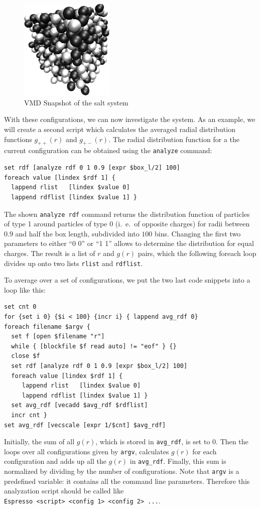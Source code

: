 \begin{figure}[tb]
  \centering
  \includegraphics[width=0.4\textwidth]{figures/salt.png}
  \caption{VMD Snapshot of the salt system}
  \label{fig:snapshot}
\end{figure}

With these configurations, we can now investigate the system. As an example, we
will create a second script which calculates the averaged radial distribution
functions $g_{++}(r)$ and $g_{+-}(r)$. The radial distribution function for a
the current configuration can be obtained using the \verb|analyze| command:
\begin{verbatim}
set rdf [analyze rdf 0 1 0.9 [expr $box_l/2] 100]
foreach value [lindex $rdf 1] {
  lappend rlist   [lindex $value 0]
  lappend rdflist [lindex $value 1] }
\end{verbatim}
The shown \verb|analyze rdf| command returns the distribution function of
particles of type 1 around particles of type 0 (i.~e.\ of opposite charges) for
radii between $0.9$ and half the box length, subdivided into $100$ bins.
Changing the first two parameters to either ``0 0'' or ``1 1'' allows to
determine the distribution for equal charges. The result is a list of $r$ and
$g(r)$ pairs, which the following foreach loop divides up onto two lists
\verb|rlist| and \verb|rdflist|.

To average over a set of configurations, we put the two last code snippets into
a loop like this:
\begin{verbatim}
set cnt 0
for {set i 0} {$i < 100} {incr i} { lappend avg_rdf 0}
foreach filename $argv {
  set f [open $filename "r"]
  while { [blockfile $f read auto] != "eof" } {}
  close $f
  set rdf [analyze rdf 0 1 0.9 [expr $box_l/2] 100]
  foreach value [lindex $rdf 1] {
     lappend rlist   [lindex $value 0]
     lappend rdflist [lindex $value 1] }
  set avg_rdf [vecadd $avg_rdf $rdflist]
  incr cnt }
set avg_rdf [vecscale [expr 1/$cnt] $avg_rdf]
\end{verbatim}
Initially, the sum of all $g(r)$, which is stored in \verb|avg_rdf|, is set to
0.  Then the loops over all configurations given by \verb|argv|, calculates
$g(r)$ for each configuration and adds up all the $g(r)$ in \verb|avg_rdf|.
Finally, this sum is normalized by dividing by the number of configurations.
Note that \verb|argv| is a predefined variable: it contains all the command line
parameters. Therefore this analyzation script should be called like\\
\verb|Espresso <script> <config 1> <config 2> ...|. 

